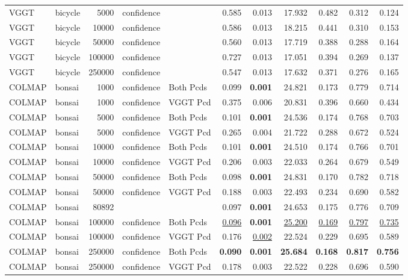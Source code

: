 \begin{table}[H]
\begin{tabular}{llrllrrrrrr}
VGGT & bicycle & 5000 & confidence &  & 0.585 & 0.013 & 17.932 & 0.482 & 0.312 & 0.124 \\
VGGT & bicycle & 10000 & confidence &  & 0.586 & 0.013 & 18.215 & 0.441 & 0.310 & 0.153 \\
VGGT & bicycle & 50000 & confidence &  & 0.560 & 0.013 & 17.719 & 0.388 & 0.288 & 0.164 \\
VGGT & bicycle & 100000 & confidence &  & 0.727 & 0.013 & 17.051 & 0.394 & 0.269 & 0.137 \\
VGGT & bicycle & 250000 & confidence &  & 0.547 & 0.013 & 17.632 & 0.371 & 0.276 & 0.165 \\
\midrule
COLMAP & bonsai & 1000 & confidence & Both Pcds & 0.099 & \textbf{0.001} & 24.821 & 0.173 & 0.779 & 0.714 \\
COLMAP & bonsai & 1000 & confidence & VGGT Pcd & 0.375 & 0.006 & 20.831 & 0.396 & 0.660 & 0.434 \\
COLMAP & bonsai & 5000 & confidence & Both Pcds & 0.101 & \textbf{0.001} & 24.536 & 0.174 & 0.768 & 0.703 \\
COLMAP & bonsai & 5000 & confidence & VGGT Pcd & 0.265 & 0.004 & 21.722 & 0.288 & 0.672 & 0.524 \\
COLMAP & bonsai & 10000 & confidence & Both Pcds & 0.101 & \textbf{0.001} & 24.510 & 0.174 & 0.766 & 0.701 \\
COLMAP & bonsai & 10000 & confidence & VGGT Pcd & 0.206 & 0.003 & 22.033 & 0.264 & 0.679 & 0.549 \\
COLMAP & bonsai & 50000 & confidence & Both Pcds & 0.098 & \textbf{0.001} & 24.831 & 0.170 & 0.782 & 0.718 \\
COLMAP & bonsai & 50000 & confidence & VGGT Pcd & 0.188 & 0.003 & 22.493 & 0.234 & 0.690 & 0.582 \\
COLMAP & bonsai & 80892 &  &  & 0.097 & \textbf{0.001} & 24.653 & 0.175 & 0.776 & 0.709 \\
COLMAP & bonsai & 100000 & confidence & Both Pcds & \underline{0.096} & \textbf{0.001} & \underline{25.200} & \underline{0.169} & \underline{0.797} & \underline{0.735} \\
COLMAP & bonsai & 100000 & confidence & VGGT Pcd & 0.176 & \underline{0.002} & 22.524 & 0.229 & 0.695 & 0.589 \\
COLMAP & bonsai & 250000 & confidence & Both Pcds & \textbf{0.090} & \textbf{0.001} & \textbf{25.684} & \textbf{0.168} & \textbf{0.817} & \textbf{0.756} \\
COLMAP & bonsai & 250000 & confidence & VGGT Pcd & 0.178 & 0.003 & 22.522 & 0.228 & 0.696 & 0.590 \\

\end{tabular}
\end{table}
